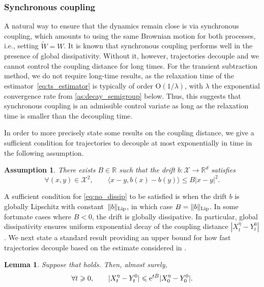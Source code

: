 \documentclass[11pt]{article}
\newcommand{\R}{\mathbb{R}}
\newcommand{\e}{\mathrm{e}}
\newcommand{\bigO}{\mathrm{O}}
\renewcommand{\geq}{\geqslant}
\renewcommand{\leq}{\leqslant}
\newtheorem{assumption}{Assumption}
\newtheorem{lemma}[theorem]{Lemma}
\theoremstyle{definition}
\newcommand{\bLip}{\|b\|_{\rm Lip}}
\begin{document}
\subsubsection{Synchronous coupling}
\label{subsubsec:synchronous_coup}
A natural way to ensure that the dynamics remain close is via synchronous coupling, which amounts to using the same Brownian motion for both processes, i.e., setting $\widetilde{W} = W$. It is known that synchronous coupling performs well in the presence of global dissipativity. Without it, however, trajectories decouple and we cannot control the coupling distance for long times. For the transient subtraction method, we do not require long-time results, as the relaxation time of the estimator~\eqref{eq:ts_estimator} is typically of order $\bigO(1/\lambda)$, with $\lambda$ the exponential convergence rate from \cref{as:decay_semigroup} below. Thus, this suggests that synchronous coupling is an admissible control variate as long as the relaxation time is smaller than the decoupling time.

In order to more precisely state some results on the coupling distance, we give a sufficient condition for trajectories to decouple at most exponentially in time in the following assumption.

\begin{assumption}
\label{as:contractivity}
	There exists $B\in\R$ such that the drift $b\colon \mathcal{X} \to \R^d$ satisfies
\begin{equation}
		\forall (x,y) \in \mathcal{X}^2, \qquad \langle x-y, b(x)-b(y)\rangle \leq B|x-y|^2.
		\label{eq:no_dissip}
	\end{equation}
\end{assumption}

A sufficient condition for \eqref{eq:no_dissip} to be satisfied is when the drift $b$ is globally Lipschitz with constant~$\bLip$, in which case $B = \bLip$. In some fortunate cases where $B<0$, the drift is globally dissipative. In particular, global dissipativity ensures uniform exponential decay of the coupling distance $|X_t^\eta - Y_t^0|$.  We next state a standard result providing an upper bound for how fast trajectories decouple based on the estimate considered in .

\begin{lemma}
	\label{lemma:decoupling_times}
	Suppose that  holds. Then, almost surely,
\begin{equation}
\notag
\forall t\geq 0, \qquad |X_t^\eta - Y_t^0| \leq \e^{tB}|X_0^\eta - Y_0^0|.
	\end{equation}
\end{lemma}
\end{document}
